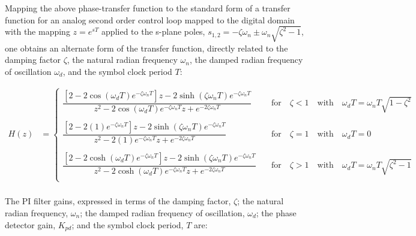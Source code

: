\documentclass{article}
\begin{document}
Mapping the above phase-transfer function to the standard form of a transfer
function for an analog second order control loop mapped to the digital domain
with the mapping $z = e^{sT}$ applied to the s-plane poles,
$s_{1,2} = -\zeta\omega_{n} \pm \omega_{n}\sqrt{\zeta^{2}-1}$, one obtains an
alternate form of the transfer function, directly related to the damping factor 
$\zeta$, the natural radian frequency $\omega_{n}$, the damped radian frequency
of oscillation $\omega_{d}$, and the symbol clock period $T$:

\begin{align*}
   H(z) &=
      \begin{cases}
         \dfrac{
                [2 -2\cos(\omega_{d}T)e^{-\zeta\omega_{n}T}] z 
                -2\sinh(\zeta\omega_{n}T)e^{-\zeta\omega_{n}T} 
               }
               {
                z^{2}
                - 2 \cos(\omega_{d}T) e^{-\zeta\omega_{n}T} z
                + e^{-2\zeta\omega_{n}T}
               }
               & \quad \text{for} \quad \zeta < 1 \quad \text{with}
               \quad \omega_{d}T = \omega_{n}T \sqrt{1 - \zeta^{2}}
               \\
\\
         \dfrac{
                [2 -2(1)e^{-\zeta\omega_{n}T}] z 
                -2\sinh(\zeta\omega_{n}T)e^{-\zeta\omega_{n}T} 
               }
               {
                z^{2}
                - 2(1)e^{-\zeta\omega_{n}T} z
                + e^{-2\zeta\omega_{n}T}
               }
               & \quad \text{for} \quad \zeta = 1 \quad \text{with}
               \quad \omega_{d}T = 0
               \\
\\
         \dfrac{
                [2 -2\cosh(\omega_{d}T)e^{-\zeta\omega_{n}T}] z 
                -2\sinh(\zeta\omega_{n}T)e^{-\zeta\omega_{n}T} 
               }
               {
                z^{2}
                - 2 \cosh(\omega_{d}T) e^{-\zeta\omega_{n}T} z
                + e^{-2\zeta\omega_{n}T}
               }
               & \quad \text{for} \quad \zeta > 1 \quad \text{with}
               \quad \omega_{d}T = \omega_{n}T \sqrt{\zeta^{2} - 1}
               \\
      \end{cases}
\\
\end{align*}

The PI filter gains, expressed in terms of the damping factor, $\zeta$;
the natural radian frequency, $\omega_{n}$; the damped radian frequency of
oscillation, $\omega_{d}$; the phase detector gain, $K_{pd}$; and the symbol
clock period, $T$ are:
\end{document}
